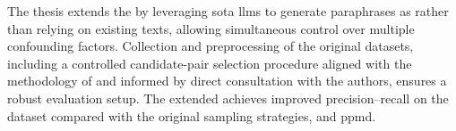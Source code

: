 The thesis extends the \impAppr{} by leveraging \acl{sota} \acp{llm} to generate paraphrases as \imps{} rather than relying on existing texts, allowing simultaneous control over multiple confounding factors.
Collection and preprocessing of the original datasets, including a controlled candidate-pair selection procedure aligned with the methodology of \citet{koppel_determining_2014} and informed by direct consultation with the authors, ensures a robust evaluation setup. 
The extended \impAppr{} achieves improved precision–recall on the \dataStudent{} dataset compared with the original sampling strategies, \unmasking{} and \acs{ppmd}.
